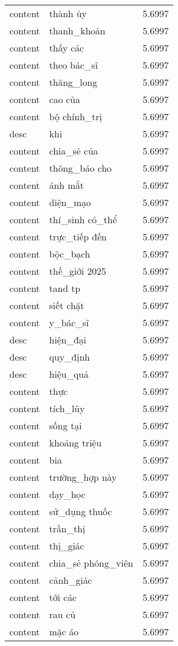 \documentclass{article}
\begin{document}
\begin{tabular}{lll}
content & thành ủy & 5.6997\\
content & thanh\_khoản & 5.6997\\
content & thấy các & 5.6997\\
content & theo bác\_sĩ & 5.6997\\
content & thăng\_long & 5.6997\\
content & cao của & 5.6997\\
content & bộ chính\_trị & 5.6997\\
desc & khi & 5.6997\\
content & chia\_sẻ của & 5.6997\\
content & thông\_báo cho & 5.6997\\
content & ánh mắt & 5.6997\\
content & diện\_mạo & 5.6997\\
content & thí\_sinh có\_thể & 5.6997\\
content & trực\_tiếp đến & 5.6997\\
content & bộc\_bạch & 5.6997\\
content & thế\_giới 2025 & 5.6997\\
content & tand tp & 5.6997\\
content & siết chặt & 5.6997\\
content & y\_bác\_sĩ & 5.6997\\
desc & hiện\_đại & 5.6997\\
desc & quy\_định & 5.6997\\
desc & hiệu\_quả & 5.6997\\
content & thực & 5.6997\\
content & tích\_lũy & 5.6997\\
content & sống tại & 5.6997\\
content & khoảng triệu & 5.6997\\
content & bia & 5.6997\\
content & trường\_hợp này & 5.6997\\
content & dạy\_học & 5.6997\\
content & sử\_dụng thuốc & 5.6997\\
content & trần\_thị & 5.6997\\
content & thị\_giác & 5.6997\\
content & chia\_sẻ phóng\_viên & 5.6997\\
content & cảnh\_giác & 5.6997\\
content & tới các & 5.6997\\
content & rau củ & 5.6997\\
content & mặc áo & 5.6997\\

\end{tabular}
\end{document}
